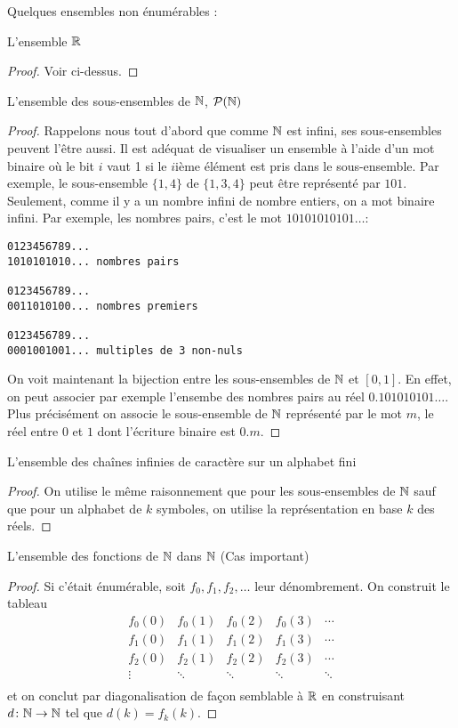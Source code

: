 Quelques ensembles non énumérables :
\begin{myexem}
 L'ensemble $\mathbb{R}$
 \begin{proof}
   Voir ci-dessus.
 \end{proof}
\end{myexem}

\begin{myexem}
 L'ensemble des sous-ensembles de $\mathbb{N}$, $\mathcal{P}(\mathbb{N})$
 \begin{proof}
   Rappelons nous tout d'abord que comme $\mathbb{N}$ est infini, ses sous-ensembles peuvent l'être aussi.
   Il est adéquat de visualiser un ensemble à l'aide d'un mot binaire
   où le bit $i$ vaut 1 si le $i$ième élément est pris dans le sous-ensemble.
   Par exemple, le sous-ensemble $\{1,4\}$ de $\{1,3,4\}$ peut être représenté par $101$.
   Seulement, comme il y a un nombre infini de nombre entiers, on a mot binaire infini.
   Par exemple, les nombres pairs, c'est le mot $10101010101\ldots$:
   \begin{verbatim}
0123456789...
1010101010... nombres pairs

0123456789...
0011010100... nombres premiers

0123456789...
0001001001... multiples de 3 non-nuls
    \end{verbatim}
   On voit maintenant la bijection entre les sous-ensembles de $\mathbb{N}$ et $[0,1]$.
   En effet, on peut associer par exemple l'ensembe des nombres pairs au réel $0.101010101\ldots$.
   Plus précisément on associe le sous-ensemble de $\mathbb{N}$ représenté par le mot $m$, le réel entre $0$ et $1$ dont l'écriture binaire est $0.m$.
 \end{proof}
\end{myexem}

\begin{myexem}
 L'ensemble des chaînes infinies de caractère sur un alphabet fini
 \begin{proof}
   On utilise le même raisonnement que pour les sous-ensembles de $\mathbb{N}$ sauf que pour un alphabet de $k$ symboles,
   on utilise la représentation en base $k$ des réels.
 \end{proof}
\end{myexem}

\begin{myexem}
  \label{exem:fNN}
 L'ensemble des fonctions de $\mathbb{N}$ dans $\mathbb{N}$ (Cas important)
 \begin{proof}
   Si c'était énumérable, soit $f_0, f_1, f_2, \ldots$ leur dénombrement.
   On construit le tableau
   \[
     \begin{array}{ccccc}
       f_0(0) & f_0(1) & f_0(2) & f_0(3) & \cdots\\
       f_1(0) & f_1(1) & f_1(2) & f_1(3) & \cdots\\
       f_2(0) & f_2(1) & f_2(2) & f_2(3) & \cdots\\
       \vdots & \ddots & \ddots & \ddots & \ddots\\
     \end{array}
   \]
   et on conclut par diagonalisation de façon semblable à $\mathbb{R}$
   en construisant $d\colon \mathbb{N} \to \mathbb{N}$ tel que $d(k) = f_k(k)$.
 \end{proof}
\end{myexem}

